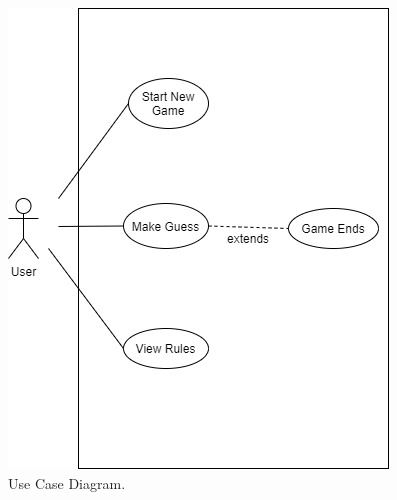 \documentclass[12pt, titlepage]{article}
\begin{document}
\begin{figure}[H]
   \centering
   \includegraphics[scale=0.5]{use_cases.jpg}
   \caption{Use Case Diagram.}
   \label{fig:use_case}
 \end{figure}
\end{document}
